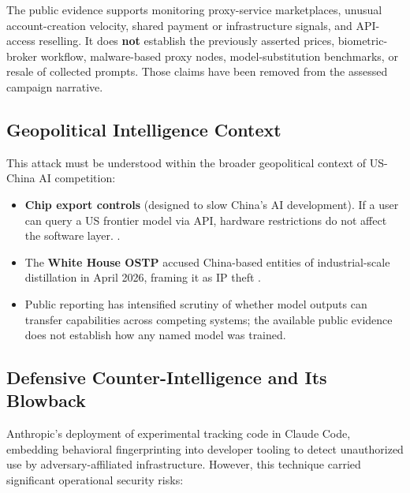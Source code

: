 \documentclass[11pt,a4paper]{article}
\begin{document}
The public evidence supports monitoring proxy-service marketplaces, unusual account-creation velocity, shared payment or infrastructure signals, and API-access reselling. It does \textbf{not} establish the previously asserted prices, biometric-broker workflow, malware-based proxy nodes, model-substitution benchmarks, or resale of collected prompts. Those claims have been removed from the assessed campaign narrative.

\subsection{Geopolitical Intelligence Context}

This attack must be understood within the broader geopolitical context of US-China AI competition:

\begin{itemize}[leftmargin=20pt, noitemsep]
    \item \textbf{Chip export controls} (designed to slow China's AI development). If a user can query a US frontier model via API, hardware restrictions do not affect the software layer. \cite{anthropic_blog}\cite{linkedin_keltner}.
    \item The \textbf{White House OSTP} accused China-based entities of industrial-scale distillation in April 2026, framing it as IP theft \cite{forbes_distillation}.
    \item Public reporting has intensified scrutiny of whether model outputs can transfer capabilities across competing systems; the available public evidence does not establish how any named model was trained.
\end{itemize}

\subsection{Defensive Counter-Intelligence and Its Blowback}

Anthropic's deployment of experimental tracking code in Claude Code, embedding behavioral fingerprinting into developer tooling to detect unauthorized use by adversary-affiliated infrastructure. However, this technique carried significant operational security risks:
\end{document}

